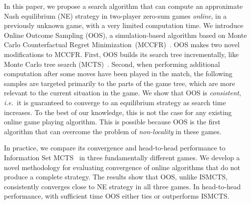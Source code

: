 \documentclass{aamas2015}
\newcommand{\ie}{{\it i.e.}~}
\begin{document}
In this paper, we propose a search algorithm that can compute an approximate Nash equilibrium (NE) strategy in two-player zero-sum games {\it online}, in a previously unknown game, with a very limited computation time. 
We introduce Online Outcome Sampling (OOS), a simulation-based algorithm based on Monte Carlo Counterfactual Regret Minimization~(MCCFR)~\cite{Lanctot09Sampling}. 
OOS makes two novel modifications to MCCFR. First, OOS builds its search tree incrementally, like Monte Carlo tree search 
(MCTS)~\cite{Coulom06Efficient,mctssurvey,UCT}. Second, when performing additional computation after some moves have been played in the match, the following samples are targeted primarily to the parts of the game tree, which are more relevant to the current situation in the game.
We show that OOS is {\it consistent}, \ie it is guaranteed to converge to an equilibrium strategy as search time increases. To the best of our knowledge, this is not the case for any existing online game playing algorithm. This is possible because OOS is the first algorithm that can overcome the problem of \emph{non-locality} in these games.

In practice, we compare its convergence and head-to-head performance to Information Set 
MCTS~\cite{Cowling12ISMCTS,Whitehouse13Integrating,Lisy14selection} in three fundamentally different games. 
We develop a novel methodology for evaluating convergence of online algorithms that do not produce a complete strategy. 
The results show that OOS, unlike ISMCTS, consistently converges close to NE strategy in all three games. In head-to-head performance, with sufficient time OOS either ties or outperforms ISMCTS. 

\end{document}
